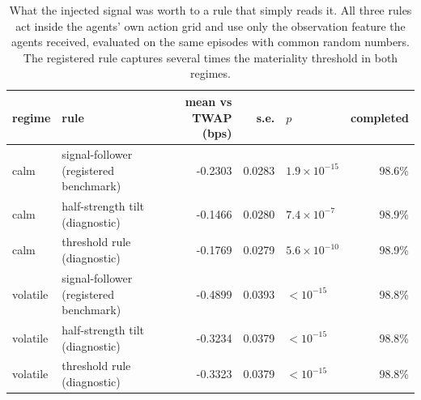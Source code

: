 \begin{table}[htbp]\centering
\caption{What the injected signal was worth to a rule that simply reads it. All three
rules act inside the agents' own action grid and use only the observation feature the
agents received, evaluated on the same episodes with common random numbers. The
registered rule captures several times the materiality threshold in both regimes.}
\label{tab:sigext-exploiter}
\small
\begin{tabular}{llrrlr}
\toprule
regime & rule & mean vs TWAP (bps) & s.e. & $p$ & completed \\
\midrule
calm & signal-follower (registered benchmark) & -0.2303 & 0.0283 & $1.9\times 10^{-15}$ & 98.6\% \\
calm & half-strength tilt (diagnostic) & -0.1466 & 0.0280 & $7.4\times 10^{-7}$ & 98.9\% \\
calm & threshold rule (diagnostic) & -0.1769 & 0.0279 & $5.6\times 10^{-10}$ & 98.9\% \\
volatile & signal-follower (registered benchmark) & -0.4899 & 0.0393 & $<10^{-15}$ & 98.8\% \\
volatile & half-strength tilt (diagnostic) & -0.3234 & 0.0379 & $<10^{-15}$ & 98.8\% \\
volatile & threshold rule (diagnostic) & -0.3323 & 0.0379 & $<10^{-15}$ & 98.8\% \\
\bottomrule
\end{tabular}
\end{table}
